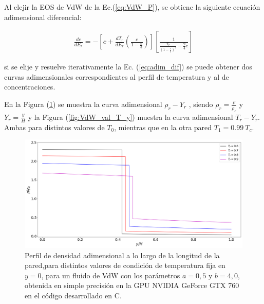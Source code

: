 Al elejir la EOS de VdW de la Ec.(\ref{eq:VdW_P}), se obtiene la siguiente ecuación adimensional diferencial:

\begin{align}
	\frac{d c}{d E_r} = - \left[ c + \frac{d T_r}{d E_r} \left( \frac{c}{1 - \frac{c}{3}}\right) \right] \left[	\frac{1}{\frac{T_r}{{\left(1- \frac{c}{3}\right)}^2} - \frac{9}{4} c}  \right] 
	\label{eq:adim_dif}
\end{align} 

si se elije y resuelve iterativamente la Ec. (\ref{eq:adim_dif}) se puede obtener dos curvas adimensionales correspondientes al perfil de temperatura y al de concentraciones. 

En la Figura (\ref{fig:VdW_val_rho_y}) se muestra la curva adimensional $ \rho_r - Y_r $ , siendo $\rho_r = \frac{\rho}{\rho_c}$ y  $Y_r = \frac{y}{H}$  y la Figura (\ref{fig:VdW_val_T_y}) muestra la curva adimensional $ T_r - Y_r $. Ambas para distintos valores de $T_0$, mientras que en la otra pared $T_1 = 0.99 \> T_c$.

\begin{figure}[htbp]
	\centering
	\includegraphics[width=\textwidth]{figs/cap4/VdW_val_rho_y}
	\caption{Perfil de densidad adimensional a lo largo de la longitud de la pared,para distintos valores de condición de temperatura fija en $y = 0$, para un fluido de VdW con los parámetros $a = 0,5 $ y $b = 4,0 $, obtenida en simple precisión en la GPU NVIDIA GeForce GTX 760 en el código desarrollado en \textsc{C}.} 
	\label{fig:VdW_val_rho_y}	
\end{figure}


